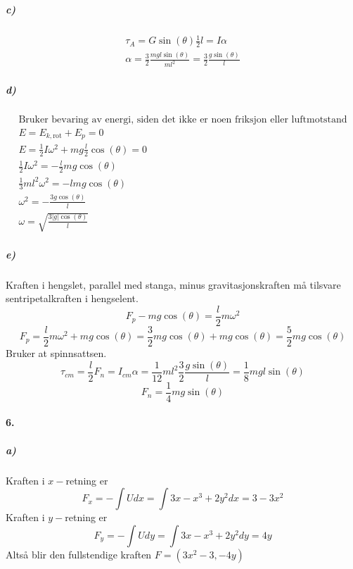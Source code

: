 \documentclass[11pt, A4paper,norsk]{article}
\begin{document}
			\subparagraph{c)}
				\begin{gather*}
\tau_A = G \sin(\theta) \frac{1}{2}l = I \alpha \\
\alpha = \frac{3}{2} \frac{mgl \sin(\theta)}{ml^2} = \frac{3}{2} \frac{g \sin(\theta)}{l}
				\end{gather*}










			\subparagraph{d)}
				\begin{gather*}
\text{Bruker bevaring av energi, siden det ikke er noen friksjon eller luftmotstand} \\
E = E_{k, \text{rot}} + E_p = 0 \\
E = \frac{1}{2} I \omega^2 + mg \frac{l}{2} \cos(\theta) = 0 \\
\frac{1}{2} I \omega^2 = - \frac{l}{2} mg \cos(\theta) \\
\frac{1}{3} m l^2 \omega^2 = - lmg \cos(\theta) \\
\omega^2 = - \frac{3g \cos(\theta)}{l} \\
\omega = \sqrt{\frac{3|g|\cos(\theta)}{l}}
				\end{gather*}






			\subparagraph{e)}
				\begin{flushleft}
Kraften i hengslet, parallel med stanga, minus gravitasjonskraften må tilsvare sentripetalkraften i hengselent.
$$F_p - mg \cos(\theta) = \frac{l}{2}m\omega^2$$
$$F_p = \frac{l}{2}m\omega^2 + mg \cos(\theta) = \frac{3}{2}mg \cos(\theta) + mg \cos(\theta) = \frac{5}{2} mg \cos(\theta)$$
Bruker at spinnsattsen.
$$\tau_{cm} = \frac{l}{2} F_n = I_{cm} \alpha = \frac{1}{12} m l^2 \frac{3}{2} \frac{g \sin(\theta)}{l} = \frac{1}{8}mgl \sin(\theta)$$
$$F_n = \frac{1}{4}mg \sin(\theta)$$
				\end{flushleft}










		\paragraph{6.}
			\subparagraph{a)}
				\begin{flushleft}
Kraften i $x-$retning er
$$F_x = - \int U dx = \int 3x - x^3 + 2y^2 dx = 3 - 3x^2$$
Kraften i $y-$retning er
$$F_y = - \int U dy = \int 3x - x^3 + 2y^2 dy = 4y$$
Altså blir den fullstendige kraften $F = (3x^2 - 3, - 4y)$
				\end{flushleft}
\end{document}
